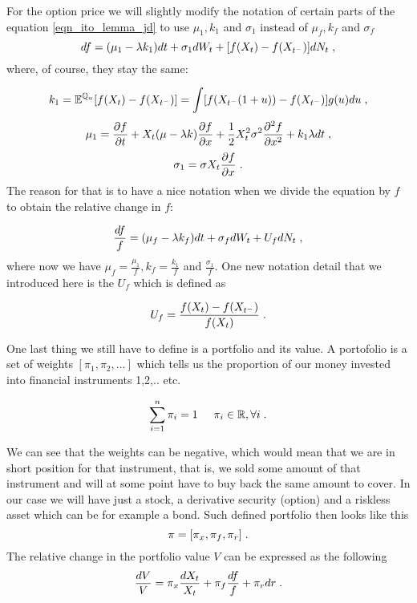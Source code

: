 \documentclass[times, utf8, diplomski]{fer}
\begin{document}
\noindent For the option price we will slightly modify the notation of certain parts of the equation \ref{eqn_ito_lemma_jd} to use $\mu_1, k_1$ and $\sigma_1$ instead of $\mu_f, k_f$ and $\sigma_f$
$$ df = (\mu_1 - \lambda k_1)dt + \sigma_1 dW_t + [f(X_t) - f(X_{t^-})]dN_t  \hspace{0.1cm},$$ where, of course, they stay the same:

$$ k_1 = \mathbb{E}^{\mathbb{Q}_u}[f(X_t) - f(X_{t^-})] = \int[f(X_{t^-}(1 + u)) - f(X_{t^-})]g(u)du \hspace{0.1cm}, $$
$$ \mu_1 = \frac{\partial f}{\partial t} + X_t(\mu - \lambda k)\frac{\partial f}{\partial x} + \frac{1}{2}X_t^2\sigma^2\frac{\partial^2 f}{\partial x^2} + k_1 \lambda dt  \hspace{0.1cm}, $$
$$ \sigma_1 = \sigma X_t\frac{\partial f}{\partial x} \hspace{0.1cm}.$$
The reason for that is to have a nice notation when we divide the equation by $f$ to obtain the relative change in $f$:

\begin{equation} \label{eqn_delta_hedge_f}
	\frac{df}{f} = (\mu_f - \lambda k_f)dt + \sigma_f dW_t + U_fdN_t  \hspace{0.1cm},
\end{equation} where now we have $\mu_f = \frac{\mu_1}{f}, k_f = \frac{k_1}{f}$ and $\frac{\sigma_1}{f}$. One new notation detail that we introduced here is the $U_f$ which is defined as

\begin{equation}
	U_f = \frac{f(X_t) - f(X_{t^-})}{f(X_t)} \hspace{0.1cm}.
\end{equation}

\noindent One last thing we still have to define is a portfolio and its value. A portofolio is a set of weights $[\pi_1, \pi_2, ...]$ which tells us the proportion of our money invested into financial instruments 1,2,.. etc. 

$$ \sum_{i=1}^{n} \pi_i = 1 \hspace{0.5cm} \pi_i \in \mathbb{R},\forall i  \hspace{0.1cm}.$$

\noindent We can see that the weights can be negative, which would mean that we are in short position for that instrument, that is, we sold some amount of that instrument and will at some point have to buy back the same amount to cover. In our case we will have just a stock, a derivative security (option) and a riskless asset which can be for example a bond. Such defined portfolio then looks like this 
$$ \pi = [\pi_x, \pi_f, \pi_r] \hspace{0.1cm}.$$
The relative change in the portfolio value $V$ can be expressed as the following
\begin{equation}\label{eqn_delta_hedge_v}
	\frac{dV}{V} = \pi_x\frac{dX_t}{X_t} + \pi_f\frac{df}{f} + \pi_r dr \hspace{0.1cm}.
\end{equation}
\end{document}
